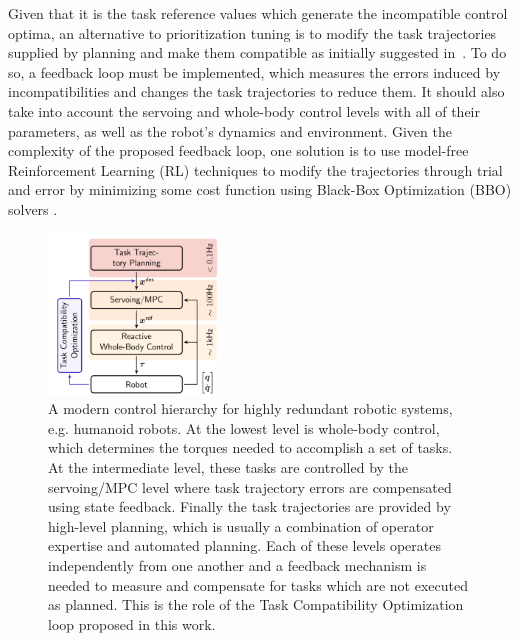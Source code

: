  Given that it is the task reference values which generate the incompatible control optima, an alternative to prioritization tuning is to modify the task trajectories supplied by planning and make them compatible as initially suggested in~\cite{Lober2014}. To do so, a feedback loop must be implemented, which measures the errors induced by incompatibilities and changes the task trajectories to reduce them. It should also take into account the servoing and whole-body control levels with all of their parameters, as well as the robot's dynamics and environment. Given the complexity of the proposed feedback loop, one solution is to use model-free Reinforcement Learning (RL) techniques to modify the trajectories through trial and error by minimizing some cost function using Black-Box Optimization (BBO) solvers \cite{Kober2013}.\\

\begin{figure}[!h]
\centering
\includegraphics[width=0.4\textwidth]{images/control_pyramid.png}
\caption{A modern control hierarchy for highly redundant robotic systems, e.g. humanoid robots. At the lowest level is whole-body control, which determines the torques needed to accomplish a set of tasks. At the intermediate level, these tasks are controlled by the servoing/MPC level where task trajectory errors are compensated using state feedback. Finally the task trajectories are provided by high-level planning, which is usually a combination of operator expertise and automated planning. Each of these levels operates independently from one another and a feedback mechanism is needed to measure and compensate for tasks which are not executed as planned. This is the role of the Task Compatibility Optimization loop proposed in this work.}
\label{fig:control_diagram}
\end{figure}


